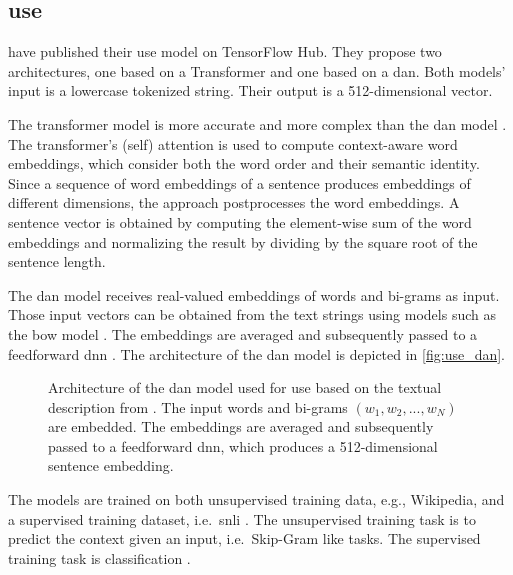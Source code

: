 \subsection{\acl*{use}}\label{subsec:univ-sent-encoder}

\citeauthor{UniversalSentEnc2018} have published their \ac{use} model on TensorFlow Hub.
They propose two architectures, one based on a Transformer and one based on a \ac{dan}.
Both models' input is a lowercase tokenized string.
Their output is a 512-dimensional vector.

The transformer model is more accurate and more complex than the \ac{dan} model \cite{UniversalSentEnc2018}.
The transformer's (self) attention is used to compute context-aware word embeddings, which consider both the word order and their semantic identity.
Since a sequence of word embeddings of a sentence produces embeddings of different dimensions, the approach postprocesses the word embeddings.
A sentence vector is obtained by computing the element-wise sum of the word embeddings 
and normalizing the result by dividing by the square root of the sentence length.

The \ac{dan} model receives real-valued embeddings of words and bi-grams as input.
Those input vectors can be obtained from the text strings using models such as the \ac{bow} model \cite{UniversalSentEnc-dan-input-emb}.
The embeddings are averaged and subsequently passed to a feedforward \ac{dnn} \cite{UniversalSentEnc2018}.
The architecture of the \ac{dan} model is depicted in \autoref{fig:use_dan}.

\begin{figure}[!htb] %
    \centering
    
    \caption[Architecture of \acs*{use}]{Architecture of the \acs*{dan} model used for \acs*{use} based on the textual description from \cite{inferSent2018}.
    The input words and bi-grams $(w_1, w_2, ..., w_N)$ are embedded.
    The embeddings are averaged and subsequently passed to a feedforward \acs*{dnn}, which produces a 512-dimensional sentence embedding.
    }
    \label{fig:use_dan}
\end{figure}

The models are trained on both unsupervised training data, e.g., Wikipedia, and a supervised training dataset, i.e.\ \ac{snli} \cite{UniversalSentEnc2018, HfsentTrans2019}.
The unsupervised training task is to predict the context given an input, i.e.\ Skip-Gram like tasks.
The supervised training task is classification \cite{UniversalSentEnc2018}.

